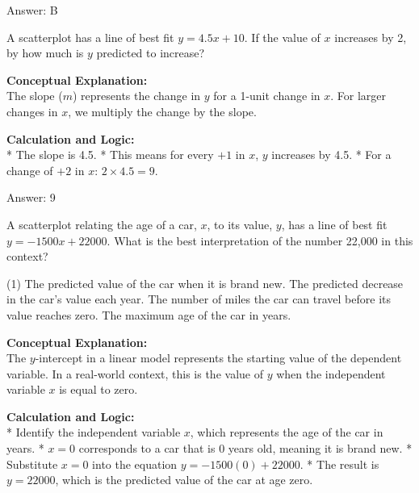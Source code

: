 \documentclass[11pt,paper=a4,answers]{exam}
\begin{document}
\begin{questions}
\begin{solution}
\vspace{30pt}

Answer: \colorbox{yellow!100}{B}
\end{solution}

\vspace{60pt}

\question
A scatterplot has a line of best fit $y = 4.5x + 10$. If the value of $x$ increases by 2, by how much is $y$ predicted to increase?

\begin{solution}
\textbf{Conceptual Explanation:} \\
The slope ($m$) represents the change in $y$ for a 1-unit change in $x$. For larger changes in $x$, we multiply the change by the slope.

\vspace{30pt}

\textbf{Calculation and Logic:} \\
* The slope is 4.5.
* This means for every $+1$ in $x$, $y$ increases by 4.5.
* For a change of $+2$ in $x$: $2 \times 4.5 = 9$.

\vspace{30pt}

Answer: \colorbox{yellow!100}{9}
\end{solution}

\question
A scatterplot relating the age of a car, $x$, to its value, $y$, has a line of best fit $y = -1500x + 22000$. What is the best interpretation of the number 22,000 in this context?
\begin{tasks}(1)
    \task The predicted value of the car when it is brand new.
    \task The predicted decrease in the car's value each year.
    \task The number of miles the car can travel before its value reaches zero.
    \task The maximum age of the car in years.
\end{tasks}

\begin{solution}
\textbf{Conceptual Explanation:} \\
The $y$-intercept in a linear model represents the starting value of the dependent variable. In a real-world context, this is the value of $y$ when the independent variable $x$ is equal to zero.

\vspace{30pt}

\textbf{Calculation and Logic:} \\
* Identify the independent variable $x$, which represents the age of the car in years.
* $x = 0$ corresponds to a car that is 0 years old, meaning it is brand new.
* Substitute $x = 0$ into the equation $y = -1500(0) + 22000$.
* The result is $y = 22000$, which is the predicted value of the car at age zero.


\end{solution}
\end{questions}
\end{document}
